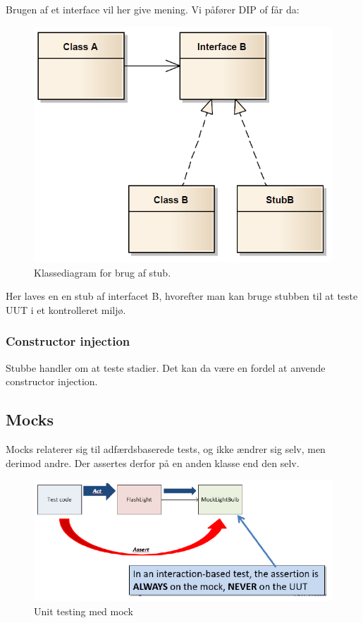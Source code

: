 Brugen af et interface vil her give mening. Vi påfører DIP of får da:

\begin{figure}[H]
	\centering
	\includegraphics[width=0.7\linewidth]{figs/stubInterface.PNG}
	\caption{Klassediagram for brug af stub.}
	\label{fig:stubInterface}
\end{figure}

Her laves en en stub af interfacet B, hvorefter man kan bruge stubben til at teste UUT i et kontrolleret miljø.

\subsubsection{Constructor injection}
Stubbe handler om at teste stadier. Det kan da være en fordel at anvende constructor injection.



\subsection{Mocks}
Mocks relaterer sig til adfærdsbaserede tests, og ikke ændrer sig selv, men derimod andre. Der assertes derfor på en anden klasse end den selv.

\begin{figure}[H]
\centering
\includegraphics[width=0.7\linewidth]{figs/mockTest.PNG}
\caption{Unit testing med mock}
\label{fig:mockTest}
\end{figure}

